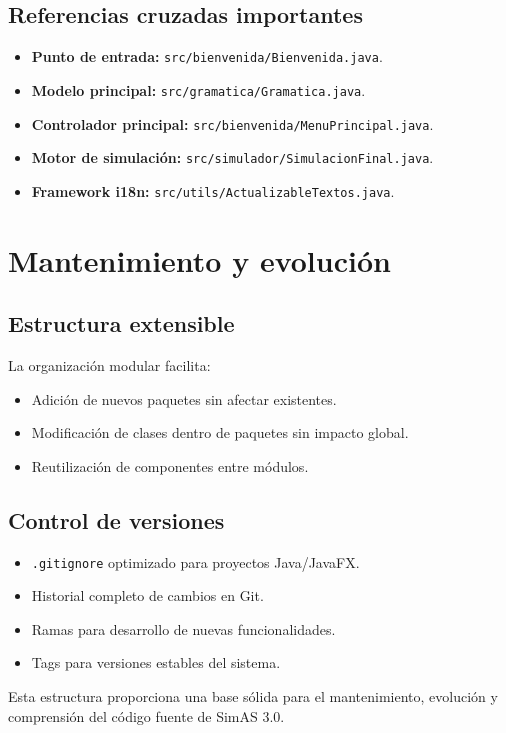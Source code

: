 \subsection{Referencias cruzadas importantes}

\begin{itemize}
    \item \textbf{Punto de entrada:} \texttt{src/bienvenida/Bienvenida.java}.
    \item \textbf{Modelo principal:} \texttt{src/gramatica/Gramatica.java}.
    \item \textbf{Controlador principal:} \texttt{src/bienvenida/MenuPrincipal.java}.
    \item \textbf{Motor de simulación:} \texttt{src/simulador/SimulacionFinal.java}.
    \item \textbf{Framework i18n:} \texttt{src/utils/ActualizableTextos.java}.
\end{itemize}

\section{Mantenimiento y evolución}

\subsection{Estructura extensible}

La organización modular facilita:
\begin{itemize}
    \item Adición de nuevos paquetes sin afectar existentes.
    \item Modificación de clases dentro de paquetes sin impacto global.
    \item Reutilización de componentes entre módulos.
\end{itemize}

\subsection{Control de versiones}

\begin{itemize}
    \item \texttt{.gitignore} optimizado para proyectos Java/JavaFX.
    \item Historial completo de cambios en Git.
    \item Ramas para desarrollo de nuevas funcionalidades.
    \item Tags para versiones estables del sistema.
\end{itemize}

Esta estructura proporciona una base sólida para el mantenimiento, evolución y comprensión del código fuente de SimAS 3.0.
